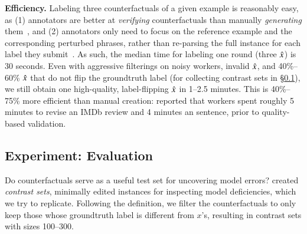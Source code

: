 \textbf{Efficiency.}
Labeling three counterfactuals of a given example is reasonably easy, as (1) annotators are better at \emph{verifying} counterfactuals than manually \emph{generating} them~\cite{ribeiro2018sear}, and (2) annotators only need to focus on the reference example and the corresponding perturbed phrases, rather than re-parsing the full instance for each label they submit~\cite{Khashabi2020MoreBF}.
As such, the median time for labeling one round (three $\hat{x}$) is 30 seconds.
Even with aggressive filterings on noisy workers, invalid $\hat{x}$, and 40\%--60\% $\hat{x}$ that do not flip the groundtruth label (for collecting contrast sets in \S\ref{subsec:contrast_set}), we still obtain one high-quality, label-flipping $\hat{x}$ in 1--2.5 minutes.
This is 40\%--75\% more efficient than manual creation:
\citet{kaushik2019learning} reported that workers spent roughly 5 minutes to revise an IMDb review and 4 minutes an \nli sentence, prior to quality-based validation.




\subsection{Experiment: Evaluation}
\label{subsec:contrast_set}

\TableAugSST
\TableAugNLI
Do \sysname counterfactuals serve as a useful test set for uncovering model errors?
\citet{gardner2020contrast} created \emph{contrast sets}, \ie minimally edited instances for inspecting model deficiencies, which we try to replicate.
Following the definition, we filter the counterfactuals to only keep those whose groundtruth label is different from $x$'s, resulting in contrast sets with sizes 100--300.


